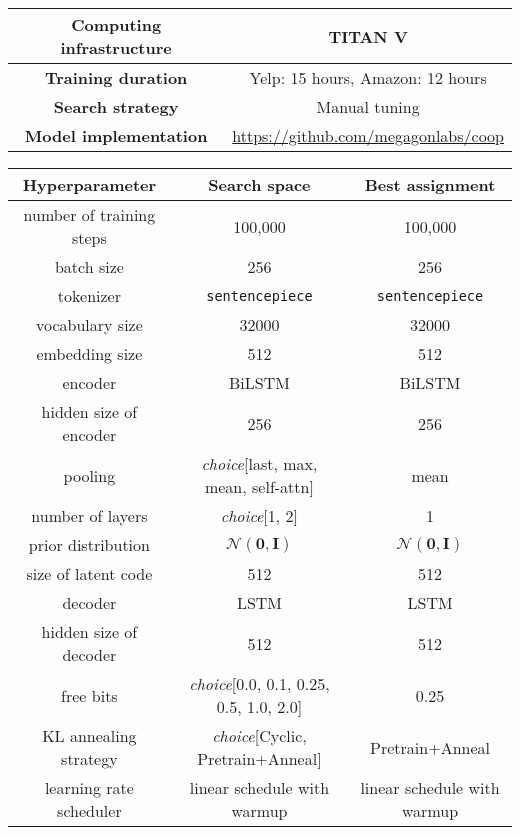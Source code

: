 \documentclass[11pt]{article}
\begin{document}
\begin{table*}[ht]
    \centering
    \small
    \begin{tabular}{cc}
        \toprule
       \textbf{Computing infrastructure} & TITAN V\\
       \midrule
       \textbf{Training duration} & Yelp: 15 hours, Amazon: 12 hours\\
       \midrule
       \textbf{Search strategy} & Manual tuning \\\midrule
       \textbf{Model implementation} & \url{https://github.com/megagonlabs/coop}\\
       \bottomrule
    \end{tabular}

    \vspace{3mm}\begin{tabular}{ccc}
    \toprule
    \textbf{Hyperparameter} & \textbf{Search space} & \textbf{Best assignment} \\
    \midrule
    number of training steps & 100,000 & 100,000\\
    \midrule
    batch size & 256 & 256\\
    \midrule
    tokenizer & \texttt{sentencepiece} & \texttt{sentencepiece} \\
    \midrule
    vocabulary size & 32000 & 32000\\
    \midrule
    embedding size & 512 & 512\\
    \midrule
    encoder & BiLSTM & BiLSTM \\
    \midrule
    hidden size of encoder & 256 & 256 \\
    \midrule
    pooling & \emph{choice}[last, max, mean, self-attn] & mean\\
    \midrule
    number of layers & \emph{choice}[1, 2] & 1 \\
    \midrule
    prior distribution & $\mathcal{N}(\boldsymbol{0}, \boldsymbol{I})$ & $\mathcal{N}(\boldsymbol{0}, \boldsymbol{I})$ \\
    \midrule
    size of latent code & 512 & 512 \\
    \midrule
    decoder & LSTM & LSTM\\
    \midrule
    hidden size of decoder & 512 & 512 \\
    \midrule
    free bits & \emph{choice}[0.0, 0.1, 0.25, 0.5, 1.0, 2.0] & 0.25\\
    \midrule
    KL annealing strategy & \emph{choice}[Cyclic, Pretrain+Anneal] & Pretrain+Anneal\\
    \midrule
    learning rate scheduler & linear schedule with warmup & linear schedule with warmup\\

\end{tabular}
\end{table*}
\end{document}

